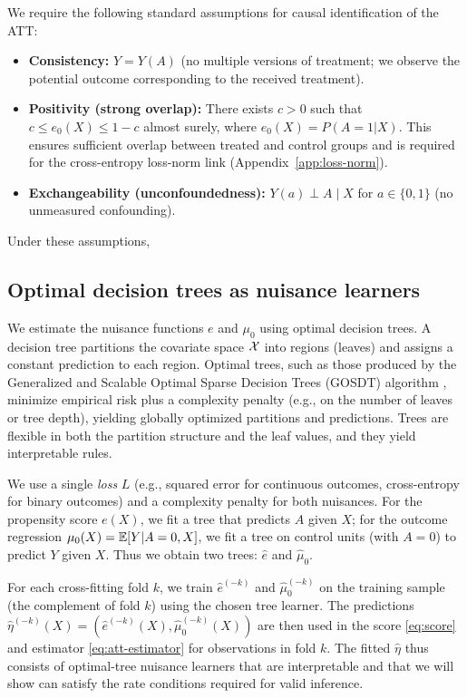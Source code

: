 \documentclass[12pt]{article}
\begin{document}
We require the following standard assumptions for causal identification of the ATT:
\begin{itemize}
\item \textbf{Consistency:} $Y = Y(A)$ (no multiple versions of treatment; we observe the potential outcome corresponding to the received treatment).
\item \textbf{Positivity (strong overlap):} There exists $c > 0$ such that $c \le e_0(X) \le 1-c$ almost surely, where $e_0(X) = P(A=1|X)$. This ensures sufficient overlap between treated and control groups and is required for the cross-entropy loss-norm link (Appendix~\ref{app:loss-norm}).
\item \textbf{Exchangeability (unconfoundedness):} $Y(a) \perp A \mid X$ for $a \in \{0,1\}$ (no unmeasured confounding).
\end{itemize} 

Under these assumptions, 


\subsection{Optimal decision trees as nuisance learners}

We estimate the nuisance functions $e$ and $\mu_0$ using optimal decision trees. A decision tree partitions the covariate space $\mathcal{X}$ into regions (leaves) and assigns a constant prediction to each region. Optimal trees, such as those produced by the Generalized and Scalable Optimal Sparse Decision Trees (GOSDT) algorithm \citep{lin2020}, minimize empirical risk plus a complexity penalty (e.g., on the number of leaves or tree depth), yielding globally optimized partitions and predictions. Trees are flexible in both the partition structure and the leaf values, and they yield interpretable rules.

We use a single \emph{loss} $L$ (e.g., squared error for continuous outcomes, cross-entropy for binary outcomes) and a complexity penalty for both nuisances. For the propensity score $e(X)$, we fit a tree that predicts $A$ given $X$; for the outcome regression $\mu_0(X) = \mathbb{E}[Y | A=0, X]$, we fit a tree on control units (with $A=0$) to predict $Y$ given $X$. Thus we obtain two trees: $\hat{e}$ and $\hat{\mu}_0$.

For each cross-fitting fold $k$, we train $\hat{e}^{(-k)}$ and $\hat{\mu}_0^{(-k)}$ on the training sample (the complement of fold $k$) using the chosen tree learner. The predictions $\hat\eta^{(-k)}(X) = (\hat{e}^{(-k)}(X), \hat{\mu}_0^{(-k)}(X))$ are then used in the score \eqref{eq:score} and estimator \eqref{eq:att-estimator} for observations in fold $k$. The fitted $\hat\eta$ thus consists of optimal-tree nuisance learners that are interpretable and that we will show can satisfy the rate conditions required for valid inference.
\end{document}
